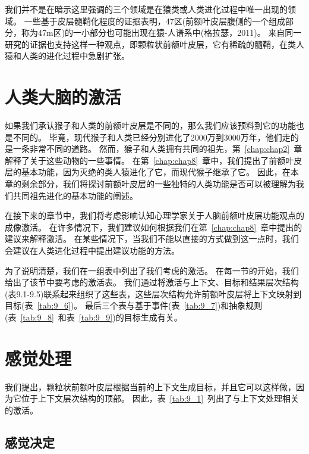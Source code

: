 我们并不是在暗示这里强调的三个领域是在猿类或人类进化过程中唯一出现的领域。
一些基于皮层髓鞘化程度的证据表明，47区(前额叶皮层腹侧的一个组成部分，称为47m区)的一小部分也可能出现在猿-人谱系中(格拉瑟，2011)。
来自同一研究的证据也支持这样一种观点，即颗粒状前额叶皮层，它有稀疏的髓鞘，在类人猿和人类的进化过程中急剧扩张。



\section{人类大脑的激活}

如果我们承认猴子和人类的前额叶皮层是不同的，那么我们应该预料到它的功能也是不同的。
毕竟，现代猴子和人类已经分别进化了2000万到3000万年，他们走的是一条非常不同的道路。
然而，猴子和人类拥有共同的祖先，第~\ref{chap:chap2}~章解释了关于这些动物的一些事情。
在第~\ref{chap:chap8}~章中，我们提出了前额叶皮层的基本功能，因为灭绝的类人猿进化了它，而现代猴子继承了它。
因此，在本章的剩余部分，我们将探讨前额叶皮层的一些独特的人类功能是否可以被理解为我们共同祖先进化的基本功能的阐述。
\par


在接下来的章节中，我们将考虑影响认知心理学家关于人脑前额叶皮层功能观点的成像激活。
在许多情况下，我们建议如何根据我们在第~\ref{chap:chap8}~章中提出的建议来解释激活。
在某些情况下，当我们不能以直接的方式做到这一点时，我们会建议在人类进化过程中提出建议功能的方法。
\par


为了说明清楚，我们在一组表中列出了我们考虑的激活。
在每一节的开始，我们给出了该节中要考虑的激活表。
我们通过将激活与上下文、目标和结果层次结构(表9.1-9.5)联系起来组织了这些表，这些层次结构允许前额叶皮层将上下文映射到目标(表~\ref{tab:9_6})。
最后三个表与基于事件(表~\ref{tab:9_7})和抽象规则(表~\ref{tab:9_8}~和表~\ref{tab:9_9})的目标生成有关。



\section{感觉处理}

我们提出，颗粒状前额叶皮层根据当前的上下文生成目标，并且它可以这样做，因为它位于上下文层次结构的顶部。
因此，表~\ref{tab:9_1}~列出了与上下文处理相关的激活。



\subsection{感觉决定}
\par

